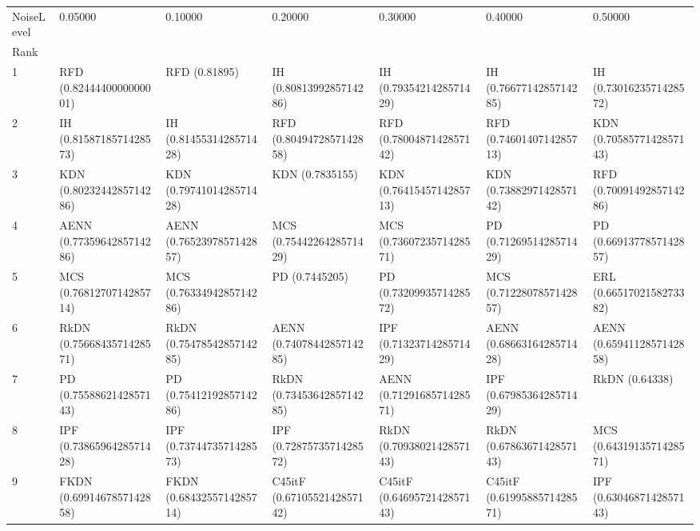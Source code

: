\begin{tabular}{lllllll}
\toprule
NoiseLevel &                        0.05000 &                        0.10000 &                        0.20000 &                        0.30000 &                        0.40000 &                        0.50000 \\
Rank &                                &                                &                                &                                &                                &                                \\
\midrule
1    &       RFD (0.8244440000000001) &                  RFD (0.81895) &        IH (0.8081399285714286) &        IH (0.7935421428571429) &        IH (0.7667714285714285) &        IH (0.7301623571428572) \\
2    &        IH (0.8158718571428573) &        IH (0.8145531428571428) &       RFD (0.8049472857142858) &       RFD (0.7800487142857142) &       RFD (0.7460140714285713) &       KDN (0.7058577142857143) \\
3    &       KDN (0.8023244285714286) &       KDN (0.7974101428571428) &                KDN (0.7835155) &       KDN (0.7641545714285713) &       KDN (0.7388297142857142) &       RFD (0.7009149285714286) \\
4    &      AENN (0.7735964285714286) &      AENN (0.7652397857142857) &       MCS (0.7544226428571429) &       MCS (0.7360723571428571) &        PD (0.7126951428571429) &        PD (0.6691377857142857) \\
5    &       MCS (0.7681270714285714) &       MCS (0.7633494285714286) &                 PD (0.7445205) &        PD (0.7320993571428572) &       MCS (0.7122807857142857) &       ERL (0.6651702158273382) \\
6    &      RkDN (0.7566843571428571) &      RkDN (0.7547854285714285) &      AENN (0.7407844285714285) &       IPF (0.7132371428571429) &      AENN (0.6866316428571428) &      AENN (0.6594112857142858) \\
7    &        PD (0.7558862142857143) &        PD (0.7541219285714286) &      RkDN (0.7345364285714285) &      AENN (0.7129168571428571) &       IPF (0.6798536428571429) &                 RkDN (0.64338) \\
8    &       IPF (0.7386596428571428) &       IPF (0.7374473571428573) &       IPF (0.7287573571428572) &      RkDN (0.7093802142857143) &      RkDN (0.6786367142857143) &       MCS (0.6431913571428571) \\
9    &      FKDN (0.6991467857142858) &      FKDN (0.6843255714285714) &    C45itF (0.6710552142857142) &    C45itF (0.6469572142857143) &    C45itF (0.6199588571428571) &       IPF (0.6304687142857143) \\

\end{tabular}
